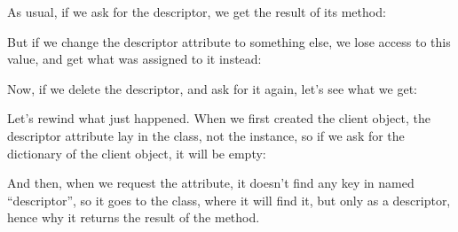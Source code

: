 \documentclass[a4paper,10pt,english]{sphinxmanual}
\begin{document}
As usual, if we ask for the descriptor, we get the result of its  method:

\begin{sphinxVerbatim}[commandchars=\\\{\}]
  
\end{sphinxVerbatim}

But if we change the descriptor attribute to something else, we lose access to this value,
and get what was assigned to it instead:

\begin{sphinxVerbatim}[commandchars=\\\{\}]
  
\end{sphinxVerbatim}

Now, if we delete the descriptor, and ask for it again, let’s see what we get:

\begin{sphinxVerbatim}[commandchars=\\\{\}]
 
\end{sphinxVerbatim}

Let’s rewind what just happened. When we first created the client object, the
descriptor attribute lay in the class, not the instance, so if we ask for the dictionary of the
client object, it will be empty:

\begin{sphinxVerbatim}[commandchars=\\\{\}]
\end{sphinxVerbatim}

And then, when we request the  attribute, it doesn’t find any key in
 named “descriptor”, so it goes to the class, where it will find it, but
only as a descriptor, hence why it returns the result of the  method.
\end{document}
